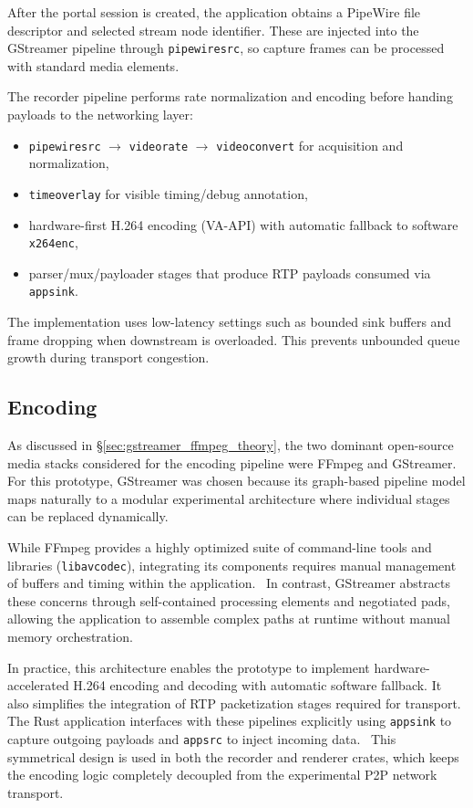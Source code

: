 After the portal session is created, the application obtains a PipeWire file descriptor and selected stream node identifier. These are injected into the GStreamer pipeline through \texttt{pipewiresrc}, so capture frames can be processed with standard media elements.

The recorder pipeline performs rate normalization and encoding before handing payloads to the networking layer:
\begin{itemize}
    \item \texttt{pipewiresrc} $\rightarrow$ \texttt{videorate} $\rightarrow$ \texttt{videoconvert} for acquisition and normalization,
    \item \texttt{timeoverlay} for visible timing/debug annotation,
    \item hardware-first H.264 encoding (VA-API) with automatic fallback to software \texttt{x264enc},
    \item parser/mux/payloader stages that produce \ac{RTP} payloads consumed via \texttt{appsink}.
\end{itemize}

The implementation uses low-latency settings such as bounded sink buffers and frame dropping when downstream is overloaded.
This prevents unbounded queue growth during transport congestion.
\subsection{Encoding}
As discussed in \S\ref{sec:gstreamer_ffmpeg_theory}, the two dominant open-source media stacks considered for the encoding pipeline were FFmpeg and GStreamer. For this prototype, GStreamer was chosen because its graph-based pipeline model maps naturally to a modular experimental architecture where individual stages can be replaced dynamically.~\cite{gstreamerTutorials2026,peroniEndtoEndPipelinePerspective2025}

While FFmpeg provides a highly optimized suite of command-line tools and libraries (\texttt{libavcodec}), integrating its components requires manual management of buffers and timing within the application.~\cite{ffmpegDocumentation2026} In contrast, GStreamer abstracts these concerns through self-contained processing elements and negotiated pads, allowing the application to assemble complex paths at runtime without manual memory orchestration.~\cite{gstreamerTutorials2026}

In practice, this architecture enables the prototype to implement hardware-accelerated H.264 encoding and decoding with automatic software fallback. It also simplifies the integration of \ac{RTP} packetization stages required for transport. The Rust application interfaces with these pipelines explicitly using \texttt{appsink} to capture outgoing payloads and \texttt{appsrc} to inject incoming data.~\cite{peroniEndtoEndPipelinePerspective2025} This symmetrical design is used in both the recorder and renderer crates, which keeps the encoding logic completely decoupled from the experimental \ac{P2P} network transport.
